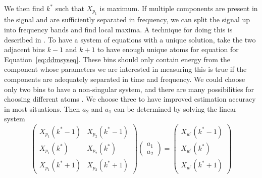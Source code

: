 \documentclass[letterpaper,12pt]{report}
\begin{document}
We then find $k^{\ast}$ such that $X_{p_{1}}$ is maximum. If multiple components are
present in the signal and are sufficiently separated in frequency, we can split
the signal up into frequency bands and find local maxima. A technique for doing
this is described in \cite{serra1989system}. To have a system of equations with a
unique solution, take the two adjacent bins $k-1$ and $k+1$ to have enough
unique atoms for equation for Equation~\ref{eq:ddmsyseq}. These bins should
only contain energy from the component whose parameters we are interested in
measuring \textemdash this is true if the components are adequately separated in
time and frequency. We could choose only two bins to have a non-singular system,
and there are many possibilities for choosing different atoms
\cite[p.~4639]{betser2009sinusoidal}. We choose three to have improved estimation
accuracy in most situations. Then $a_2$ and $a_1$ can be determined by
solving the linear system
\[
    \begin{pmatrix}
        X_{p_{1}} \left( k^{\ast} - 1 \right) & X_{p_{2}} \left( k^{\ast} - 1 \right) \\
        X_{p_{1}} \left( k^{\ast} \right) & X_{p_{2}} \left( k^{\ast} \right) \\
        X_{p_{1}} \left( k^{\ast} + 1 \right) & X_{p_{2}} \left( k^{\ast} + 1 \right)
    \end{pmatrix}
    \begin{pmatrix}
        a_1 \\
        a_2
    \end{pmatrix}
    =
    \begin{pmatrix}
        X_{w^{\prime}} \left( k^{\ast} - 1 \right) \\
        X_{w^{\prime}} \left( k^{\ast} \right) \\
        X_{w^{\prime}} \left( k^{\ast} + 1 \right)
    \end{pmatrix}
\]




\end{document}
